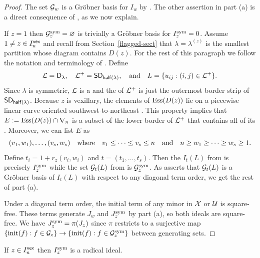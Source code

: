 \documentclass[10pt]{article}
\begin{document}
 \begin{proof}
The set  $\mathcal{G}_w$ is a Gr\"obner basis for  $I_w$ by \cite[Thm.~3.8]{KnutsonMillerYong}. The other assertion in part (a) is a direct consequence of \cite[Thm.~4.8]{GMN}, as we now explain.

If $z=1$ then $\mathcal{G}^{\mathrm{sym}}_z=\varnothing$ is trivially a Gr\"obner basis for $I^{\mathrm{sym}}_z =0$.
Assume $1\neq z \in I^{\mathsf{vex}}_n$ and recall from Section~\ref{flagged-sect}
that $\lambda = \lambda^{(z)}$ is the smallest partition
whose diagram contains $D(z)$. 
For the rest of this paragraph we follow the notation and terminology of \cite[\S4]{GMN}.
Define 
\[\mathcal{L} = \mathsf{D}_\lambda, 
\quad\mathcal{L}^+ = \mathsf{SD}_{\mathsf{half}(\lambda)},
\quad\text{and}\quad
L = \{u_{ij} : (i,j)\in \mathcal{L}^+\}.\] Since $\lambda$ is symmetric,  $\mathcal{L}$ is a 
and the  of $\mathcal{L}^+$ is just the outermost border strip of $\mathsf{SD}_{\mathsf{half}(\lambda)}$.
Because $z$ is vexillary, the elements of   $\operatorname{Ess}(D(z))$ lie on a piecewise linear curve oriented southwest-to-northeast \cite[Prop.~2.2.8]{Manivel}. This property implies that 
 $E := \operatorname{Ess}(D(z))\cap\nabla_n$ is a subset of the lower border of $\mathcal{L}^+$ that contains all
of its  . Moreover, we can list   $E$  
 as 
 \[(v_1,w_1),\dots,(v_s,w_s)\quad\text{where}\quad v_1\leq \dots\leq v_s\leq n\quad\text{and}\quad n\geq w_1\geq \dots \geq w_s\geq 1.\]
Define $t_i =1+r_z(v_i,w_i)$ and $t=(t_1,\dots,t_s)$.
Then the  $I_t(L)$ from \cite[Def.~4.3]{GMN} is precisely $I^{\mathrm{sym}}_z$ while the set $\mathcal{G}_t(L)$ from \cite[Not.~4.4]{GMN} is $\mathcal{G}^{\mathrm{sym}}_z$.
As \cite[Thm.~4.8]{GMN} asserts that  $\mathcal{G}_t(L)$ is a Gr\"obner basis of $I_t(L)$ with respect to any diagonal term order, we get the rest of part (a).

 Under a diagonal term order,
 the initial term of any minor in $\mathcal{X}$ or $\mathcal{U}$ is square-free.
 These terms generate
 $J_w$ and $J^{\mathrm{sym}}_z$ by part (a), so both ideals are square-free.
 We have $J^{\mathrm{sym}}_z = \pi(J_z)$ since $\pi$ restricts to a surjective map $\{ \mathrm{init}(f) : f \in \mathcal{G}_z\} \to \{ \mathrm{init}(f) : f\in \mathcal{G}^{\mathrm{sym}}_z\}$
 between generating sets.
 \end{proof}


\begin{corollary}
If $z \in I^{\mathsf{vex}}_n$ then $I^{\mathrm{sym}}_z$ is a radical ideal.
\end{corollary}
\end{document}
